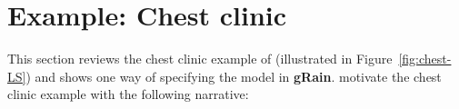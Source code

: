 \documentclass[10pt]{article}\usepackage[]{graphicx}\usepackage[]{xcolor}
\def\grbn{{\bf gRain}}
\begin{document}





\section{Example: Chest clinic}
\label{sec:chest-clinic}
\label{sec:chest}













This section reviews the chest clinic example of \cite{lau/spieg:88}
(illustrated in Figure~\ref{fig:chest-LS}) and shows one way of
specifying the model in \grbn{}.  \cite{lau/spieg:88} motivate the
chest clinic example with the following narrative:
\end{document}
